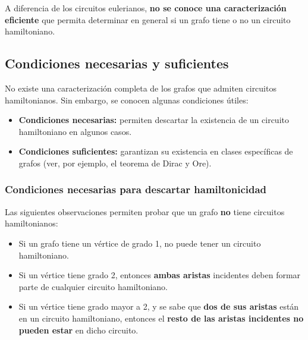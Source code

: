 A diferencia de los circuitos eulerianos, \textbf{no se conoce una caracterización eficiente} que permita determinar en general si un grafo tiene o no un circuito hamiltoniano.


\subsection{Condiciones necesarias y suficientes}

No existe una caracterización completa de los grafos que admiten circuitos hamiltonianos. Sin embargo, se conocen algunas condiciones útiles:

\begin{itemize}
  \item \textbf{Condiciones necesarias:} permiten descartar la existencia de un circuito hamiltoniano en algunos casos.
  \item \textbf{Condiciones suficientes:} garantizan su existencia en clases específicas de grafos (ver, por ejemplo, el teorema de Dirac y Ore).
\end{itemize}

\subsubsection{Condiciones necesarias para descartar hamiltonicidad}

Las siguientes observaciones permiten probar que un grafo \textbf{no} tiene circuitos hamiltonianos:

\begin{itemize}
  \item Si un grafo tiene un vértice de grado 1, no puede tener un circuito hamiltoniano.
  \item Si un vértice tiene grado 2, entonces \textbf{ambas aristas} incidentes deben formar parte de cualquier circuito hamiltoniano.
  \item Si un vértice tiene grado mayor a 2, y se sabe que \textbf{dos de sus aristas} están en un circuito hamiltoniano, entonces el \textbf{resto de las aristas incidentes no pueden estar} en dicho circuito.
\end{itemize}


